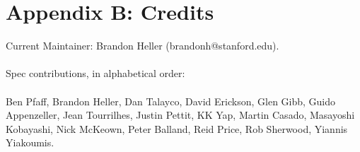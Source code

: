 \section{Appendix B: Credits}

Current Maintainer: Brandon Heller (brandonh@stanford.edu).
\\\\
Spec contributions, in alphabetical order:
\\\\
Ben Pfaff,
Brandon Heller,
Dan Talayco,
David Erickson,
Glen Gibb,
Guido Appenzeller,
Jean Tourrilhes,
Justin Pettit,
KK Yap,
Martin Casado,
Masayoshi Kobayashi,
Nick McKeown,
Peter Balland,
Reid Price,
Rob Sherwood,
Yiannis Yiakoumis.
